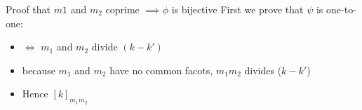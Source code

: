 \begin{parag}{Proof that $m1$ and $m_2$ coprime $ \implies \phi$ is bijective}
    First we prove that $\psi$ is one-to-one:
    \begin{itemize}
        \item $ \iff$ $m_1$ and $m_2$ divide $(k-k')$
        \item because $m_1$ and $m_2$ have no common facots, $m_1m_2$ divides ($k - k'$)
        \item Hence $[k]_{m_1m_2}$ 
    \end{itemize}

\end{parag}


